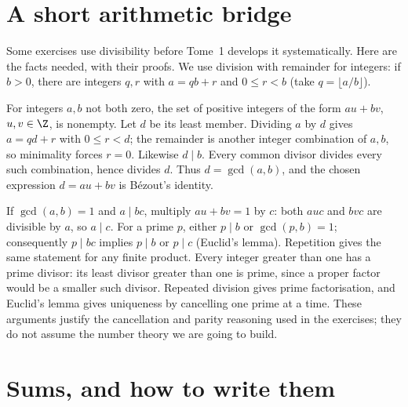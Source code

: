 
\section*{A short arithmetic bridge}
Some exercises use divisibility before Tome~1 develops it systematically. Here are the facts needed, with their proofs. We use division with remainder for integers: if $b>0$, there are integers $q,r$ with $a=qb+r$ and $0\le r<b$ (take $q=\lfloor a/b\rfloor$).

For integers $a,b$ not both zero, the set of positive integers of the form $au+bv$, $u,v\in\Z$, is nonempty. Let $d$ be its least member. Dividing $a$ by $d$ gives $a=qd+r$ with $0\le r<d$; the remainder is another integer combination of $a,b$, so minimality forces $r=0$. Likewise $d\mid b$. Every common divisor divides every such combination, hence divides $d$. Thus $d=\gcd(a,b)$, and the chosen expression $d=au+bv$ is B\'ezout's identity.

If $\gcd(a,b)=1$ and $a\mid bc$, multiply $au+bv=1$ by $c$: both $auc$ and $bvc$ are divisible by $a$, so $a\mid c$. For a prime $p$, either $p\mid b$ or $\gcd(p,b)=1$; consequently $p\mid bc$ implies $p\mid b$ or $p\mid c$ (Euclid's lemma). Repetition gives the same statement for any finite product. Every integer greater than one has a prime divisor: its least divisor greater than one is prime, since a proper factor would be a smaller such divisor. Repeated division gives prime factorisation, and Euclid's lemma gives uniqueness by cancelling one prime at a time. These arguments justify the cancellation and parity reasoning used in the exercises; they do not assume the number theory we are going to build.

\section{Sums, and how to write them}

